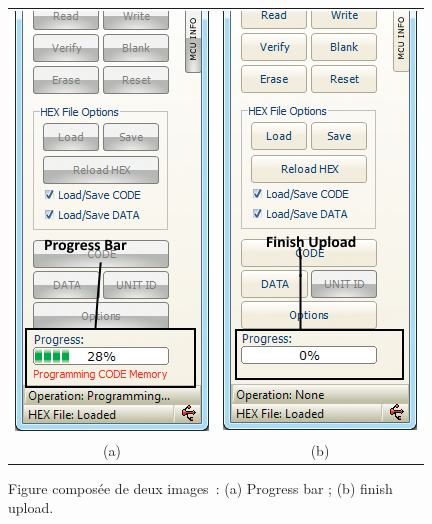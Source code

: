 \documentclass[a4paper, 12pt]{book}
\begin{document}
\begin{figure}[htbp]
  \centering
  \begin{tabular}{cc}
    \includegraphics[height=0.4\textheight]{images/progress_bar.png}&
    \includegraphics[height=0.4\textheight]{images/finish_upload.png}\\
    (a)&(b)
  \end{tabular}
  \caption{Figure composée de deux images~: (a) Progress bar ; (b) finish upload.\label{fig-tab}}
\end{figure}
\end{document}
